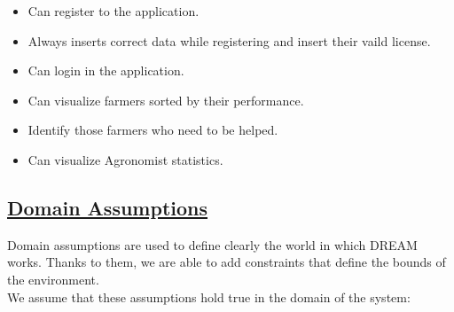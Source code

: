 \begin{itemize}
			\begin{itemize}
				\item Can register to the application.
				\item Always inserts correct data while registering and insert their vaild license.
				\item Can login in the application.
				\item Can visualize farmers sorted by their performance.
				\item Identify those farmers who need to be helped.
				\item Can visualize Agronomist statistics. 
			\end{itemize}
	\end{itemize}
	
\subsection[Domain Assumptions]{\hyperlink{toc}{Domain Assumptions}}
	\label{sec:domainAssumptions}
	Domain assumptions are used to define clearly the world in which DREAM works. Thanks to them, we are able to add constraints that define the bounds of the environment. \\
	
	We assume that these assumptions hold true in the domain of the system:
		

